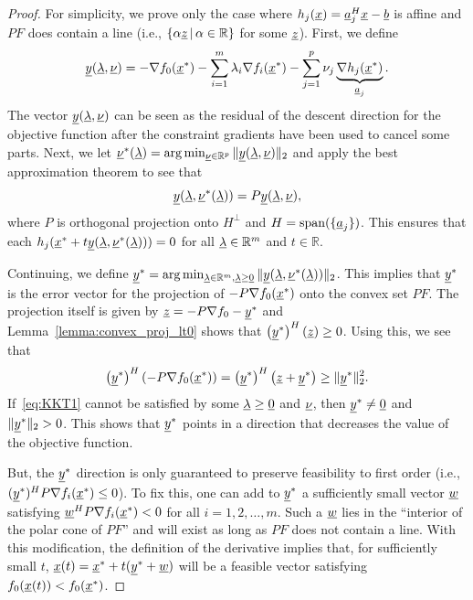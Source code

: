 \begin{proof}
For simplicity, we prove only the case where $h_j (\underline{x}) = \underline{a}_j^H \underline{x} - \underline{b}$ is affine and $PF$ does contain a line (i.e., $\{\alpha \underline{z}\,|\, \alpha \in \mathbb{R}\}$ for some $\underline{z}$).  First, we define 
\[ \underline{y} (\underline{\lambda},\underline{\nu}) = -\nabla f_0 (\underline{x}^*) - \sum_{i=1}^m \lambda_i \nabla f_i (\underline{x}^*) - \sum_{j=1}^p \nu_j \underbrace{\nabla h_j (\underline{x}^*)}_{\underline{a}_j}. \]
The vector $\underline{y} (\underline{\lambda},\underline{\nu})$ can be seen as the residual of the descent direction for the objective function after the constraint gradients have been used to cancel some parts.
Next, we let $\underline{\nu}^* (\underline{\lambda}) = \arg \min_{\underline{\nu}\in \mathbb{R}^p} \| \underline{y} (\underline{\lambda},\underline{\nu}) \|_2$
and apply the best approximation theorem to see that
\[ \underline{y} (\underline{\lambda},\underline{\nu}^* (\underline{\lambda})) = P \underline{y} (\underline{\lambda},\underline{\nu}), \]
where $P$ is orthogonal projection onto $H^\perp$ and $H = \mathrm{span} ( \{ \underline{a}_j \} )$.
This ensures that each $h_j ( \underline{x}^* + t \underline{y} (\underline{\lambda},\underline{\nu}^* (\underline{\lambda})) )=0$ for all $\underline{\lambda}\in \mathbb{R}^m$ and $t\in \mathbb{R}$.

Continuing, we define $\underline{y}^* = \arg \min_{\underline{\lambda} \in \mathbb{R}^m, \underline{\lambda} \geq \underline{0}} \| \underline{y} (\underline{\lambda},\underline{\nu}^* (\underline{\lambda})) \|_2 $.
This implies that $\underline{y}^*$ is the error vector for the projection of $-P\nabla f_0 (\underline{x}^*)$ onto the convex set $PF$.
The projection itself is given by $\underline{z}=-P\nabla f_0 - \underline{y}^*$ and Lemma~\ref{lemma:convex_proj_lt0} shows that $\left( \underline{y}^* \right)^H \left( \underline{z} \right) \geq 0$.
Using this, we see that
\[ \left( \underline{y}^* \right)^H \left(-P \nabla f_0 (\underline{x}^*) \right)
= \left(\underline{y}^* \right)^H \left(\underline{z}+\underline{y}^* \right)
 \geq \| \underline{y}^* \|_2^2.
\]
If~\eqref{eq:KKT1} cannot be satisfied by some $\underline{\lambda} \geq \underline{0}$ and $\underline{\nu}$, then $\underline{y}^* \neq \underline{0}$ and $\| \underline{y}^* \|_2 > 0$.
This shows that $\underline{y}^*$ points in a direction that decreases the value of the objective function.

But, the $\underline{y}^*$ direction is only guaranteed to preserve feasibility to first order (i.e., $(\underline{y}^*)^H P \nabla f_i (\underline{x}^*) \leq 0$).
To fix this, one can add to $\underline{y}^*$ a sufficiently small vector $\underline{w}$ satisfying $\underline{w}^H P \nabla f_i (\underline{x}^*) < 0$ for all $i=1,2,\ldots,m$.
Such a $\underline{w}$ lies in the ``interior of the polar cone of $PF$'' and will exist as long as $PF$ does not contain a line.
With this modification, the definition of the derivative implies that, for sufficiently small $t$, $\underline{x}(t) = \underline{x}^* + t (\underline{y}^* + \underline{w})$ will be a feasible vector satisfying $f_0 (\underline{x}(t)) < f_0 (\underline{x}^*)$.
\end{proof}

